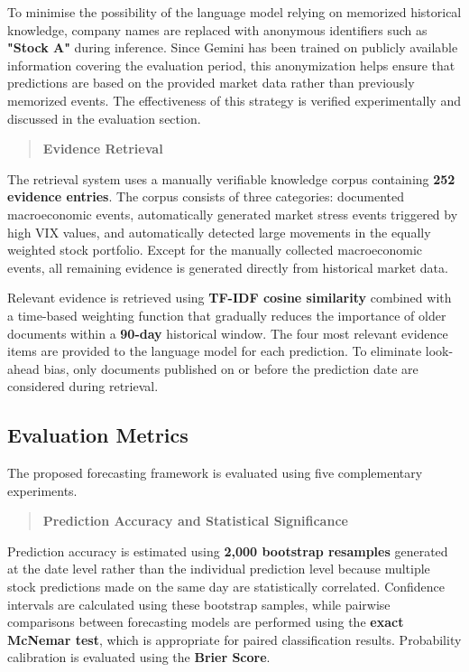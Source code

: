 To minimise the possibility of the language model relying on memorized
historical knowledge, company names are replaced with anonymous
identifiers such as \textbf{"Stock A"} during inference. Since Gemini
has been trained on publicly available information covering the
evaluation period, this anonymization helps ensure that predictions are
based on the provided market data rather than previously memorized
events. The effectiveness of this strategy is verified experimentally
and discussed in the evaluation section.

\begin{quote}
\textbf{Evidence Retrieval}
\end{quote}

The retrieval system uses a manually verifiable knowledge corpus
containing \textbf{252 evidence entries}. The corpus consists of three
categories: documented macroeconomic events, automatically generated
market stress events triggered by high VIX values, and automatically
detected large movements in the equally weighted stock portfolio. Except
for the manually collected macroeconomic events, all remaining evidence
is generated directly from historical market data.

Relevant evidence is retrieved using \textbf{TF-IDF cosine similarity}
combined with a time-based weighting function that gradually reduces the
importance of older documents within a \textbf{90-day} historical
window. The four most relevant evidence items are provided to the
language model for each prediction. To eliminate look-ahead bias, only
documents published on or before the prediction date are considered
during retrieval.

\subsection{Evaluation Metrics}\label{sec:evaluation-metrics}

The proposed forecasting framework is evaluated using five complementary
experiments.

\begin{quote}
\textbf{Prediction Accuracy and Statistical Significance}
\end{quote}

Prediction accuracy is estimated using \textbf{2,000 bootstrap
resamples} generated at the date level rather than the individual
prediction level because multiple stock predictions made on the same day
are statistically correlated. Confidence intervals are calculated using
these bootstrap samples, while pairwise comparisons between forecasting
models are performed using the \textbf{exact McNemar test}, which is
appropriate for paired classification results. Probability calibration
is evaluated using the \textbf{Brier Score}.

